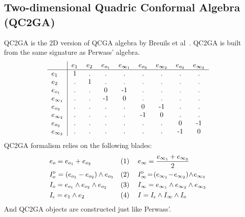 \documentclass{birkjour}
\begin{document}
\subsection{Two-dimensional Quadric Conformal Algebra (QC2GA)}
\label{sec:qc2ga}
QC2GA is the 2D version of QCGA algebra by Breuils et al~\cite{breuils_three-dimensional_2019}.
QC2GA is built from the same signature as Perwass' algebra.
\begin{equation}
    \begin{tabular}{l|cccccccc}
    & \gavec{1}{}
    & \gavec{2}{}
    & \gavec{o}{1}
    & \gavec{\infty}{1}
    & \gavec{o}{2}
    & \gavec{\infty}{2}
    & \gavec{o}{3}
    & \gavec{\infty}{3} \\
    \hline
    \gavec{1}{}           & 1 & . & . & . & . & . & . & . \\
    \gavec{2}{}           & . & 1 & . & . & . & . & . & . \\
    \gavec{o}{1}          & . & . & 0 &-1 & . & . & . & . \\
    \gavec{\infty}{1}     & . & . &-1 & 0 & . & . & . & . \\
    \gavec{o}{2}          & . & . & . & . & 0 &-1 & . & . \\
    \gavec{\infty}{2}     & . & . & . & . &-1 & 0 & . & . \\
    \gavec{o}{3}          & . & . & . & . & . & . & 0 &-1 \\
    \gavec{\infty}{3}     & . & . & . & . & . & . &-1 & 0
    \end{tabular}
\end{equation}
QC2GA formalism relies on the following blades:
\begin{subequations}\label{eq:qc2ga-blades}
\begin{align}\displaystyle
&e_o = e_{o_1} + e_{o_2} &\forcenumbering&&
& e_{\infty} =  \frac{e_{\infty_1} + e_{\infty_2}}{2}\\
&I_o^\triangleright = \left(e_{o_1} - e_{o_2}\right) \wedge e_{o_3}   &\forcenumbering&\:&
&I_{\infty}^\triangleright\! =\! \left(e_{\infty_1}\! -\! e_{\infty_2}\right)\! \wedge\! e_{\infty_3} \\
&I_o = e_{o_1} \wedge e_{o_2} \wedge e_{o_3}   &\forcenumbering&&
&I_{\infty} = e_{\infty_1} \wedge e_{\infty_2} \wedge e_{\infty_3}  \\
&I_\epsilon = e_1 \wedge e_2   &\forcenumbering&&
&I = I_\epsilon \wedge I_{\infty} \wedge I_o
\end{align}
\end{subequations}
And QC2GA objects are constructed just like Perwass'.
\end{document}
